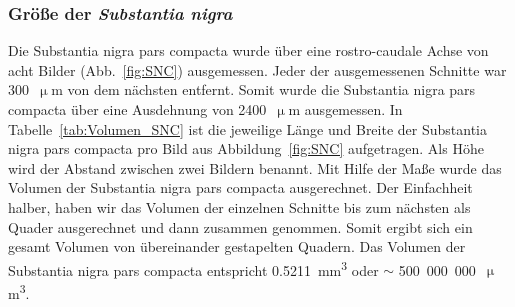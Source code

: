 \documentclass[12pt,a4paper,pdftex]{article}
\begin{document}

\subsubsection{Größe der \textit{Substantia nigra}}


Die Substantia nigra pars compacta  wurde über eine rostro-caudale Achse von acht Bilder (Abb.~\ref{fig:SNC}) ausgemessen. Jeder der ausgemessenen Schnitte war 300~$\upmu$m von dem nächsten entfernt. Somit wurde die Substantia nigra pars compacta über eine Ausdehnung von 2400~$\upmu$m ausgemessen. In Tabelle~\ref{tab:Volumen_SNC} ist die jeweilige Länge und Breite der Substantia nigra pars compacta pro Bild aus Abbildung~\ref{fig:SNC} aufgetragen. Als Höhe wird der Abstand zwischen zwei Bildern benannt. Mit Hilfe der Maße wurde das Volumen der Substantia nigra pars compacta ausgerechnet. Der Einfachheit halber, haben wir das Volumen der einzelnen Schnitte bis zum nächsten als Quader ausgerechnet und dann zusammen genommen. Somit ergibt sich ein gesamt Volumen von übereinander gestapelten Quadern. Das Volumen der Substantia nigra pars compacta entspricht 0.5211~mm\textsuperscript{3} oder $\sim$ 500~000~000~$\upmu$m\textsuperscript{3}.
\end{document}

